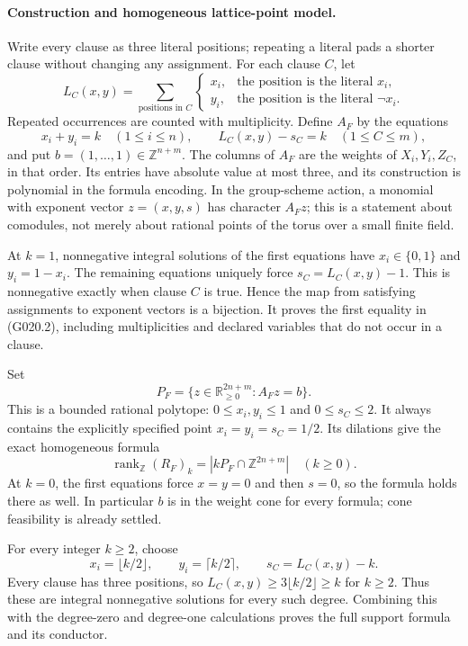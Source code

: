 \paragraph{Construction and homogeneous lattice-point model.}
Write every clause as three literal positions; repeating a literal
pads a shorter clause without changing any assignment. For each
clause $C$, let
\[
 L_C(x,y)=\sum_{\text{positions in }C}
 \begin{cases}x_i,&\text{the position is the literal }x_i,\\
 y_i,&\text{the position is the literal }\neg x_i.
 \end{cases}
\]
Repeated occurrences are counted with multiplicity. Define $A_F$
by the equations
\[
 x_i+y_i=k\quad(1\leq i\leq n),\qquad
 L_C(x,y)-s_C=k\quad(1\leq C\leq m),
 \tag{G020.3}
\]
and put $b=(1,\ldots,1)\in\mathbb Z^{n+m}$. The columns of $A_F$
are the weights of $X_i,Y_i,Z_C$, in that order. Its entries have
absolute value at most three, and its construction is polynomial
in the formula encoding. In the group-scheme action, a monomial
with exponent vector $z=(x,y,s)$ has character $A_Fz$; this is a
statement about comodules, not merely about rational points of
the torus over a small finite field.

At $k=1$, nonnegative integral solutions of the first equations
have $x_i\in\{0,1\}$ and $y_i=1-x_i$. The remaining equations
uniquely force $s_C=L_C(x,y)-1$. This is nonnegative exactly
when clause $C$ is true. Hence the map from satisfying assignments
to exponent vectors is a bijection. It proves the first equality
in (G020.2), including multiplicities and declared variables that
do not occur in a clause.

Set
\[
 P_F=\{z\in\mathbb R_{\geq0}^{2n+m}:A_Fz=b\}.
\]
This is a bounded rational polytope: $0\leq x_i,y_i\leq1$ and
$0\leq s_C\leq2$. It always contains the explicitly specified
point $x_i=y_i=s_C=1/2$. Its dilations give the exact homogeneous
formula
\[
 \operatorname{rank}_{\mathbb Z}(R_F)_k
   =|kP_F\cap\mathbb Z^{2n+m}|\quad(k\geq0).
 \tag{G020.4}
\]
At $k=0$, the first equations force $x=y=0$ and then $s=0$,
so the formula holds there as well. In particular $b$ is in the
weight cone for every formula; cone feasibility is already settled.

For every integer $k\geq2$, choose
\[
 x_i=\lfloor k/2\rfloor,\qquad
 y_i=\lceil k/2\rceil,\qquad
 s_C=L_C(x,y)-k.
 \tag{G020.5}
\]
Every clause has three positions, so
$L_C(x,y)\geq3\lfloor k/2\rfloor\geq k$ for $k\geq2$.
Thus these are integral nonnegative solutions for every such
degree. Combining this with the degree-zero and degree-one
calculations proves the full support formula and its conductor.

